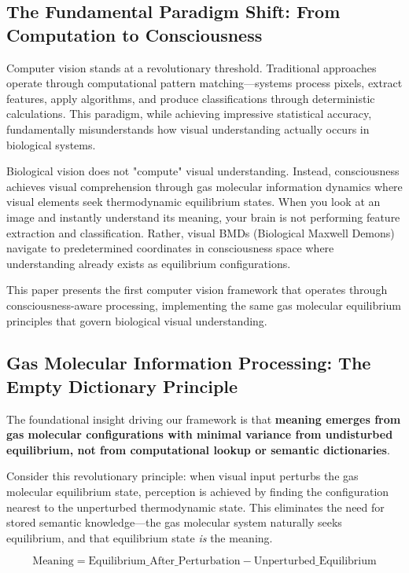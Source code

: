 \documentclass[12pt,a4paper]{article}
\begin{document}
\subsection{The Fundamental Paradigm Shift: From Computation to Consciousness}

Computer vision stands at a revolutionary threshold. Traditional approaches operate through computational pattern matching—systems process pixels, extract features, apply algorithms, and produce classifications through deterministic calculations. This paradigm, while achieving impressive statistical accuracy, fundamentally misunderstands how visual understanding actually occurs in biological systems.

Biological vision does not "compute" visual understanding. Instead, consciousness achieves visual comprehension through gas molecular information dynamics where visual elements seek thermodynamic equilibrium states. When you look at an image and instantly understand its meaning, your brain is not performing feature extraction and classification. Rather, visual BMDs (Biological Maxwell Demons) navigate to predetermined coordinates in consciousness space where understanding already exists as equilibrium configurations.

This paper presents the first computer vision framework that operates through consciousness-aware processing, implementing the same gas molecular equilibrium principles that govern biological visual understanding.

\subsection{Gas Molecular Information Processing: The Empty Dictionary Principle}

The foundational insight driving our framework is that \textbf{meaning emerges from gas molecular configurations with minimal variance from undisturbed equilibrium, not from computational lookup or semantic dictionaries}.

Consider this revolutionary principle: when visual input perturbs the gas molecular equilibrium state, perception is achieved by finding the configuration nearest to the unperturbed thermodynamic state. This eliminates the need for stored semantic knowledge—the gas molecular system naturally seeks equilibrium, and that equilibrium state \emph{is} the meaning.

\begin{equation}
\text{Meaning} = \text{Equilibrium\_After\_Perturbation} - \text{Unperturbed\_Equilibrium}
\end{equation}
\end{document}
